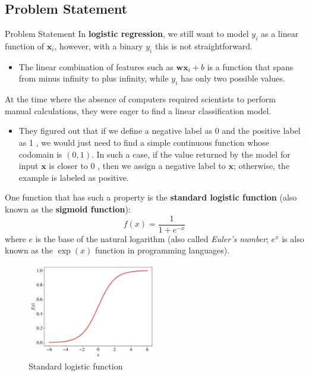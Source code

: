 \documentclass[9pt,dvipsnames]{beamer}
\begin{document}
\subsection{Problem Statement}
\begin{frame}{Problem Statement}
	In \textbf{logistic regression}, we still want to model $y_{i}$ as a linear function of $\mathbf{x}_{i}$, however, with a binary $y_{i}$ this is not straightforward. 
	\begin{itemize}
		\item The linear combination of features such as $\mathbf{w} \mathbf{x}_{i}+b$ is a function that spans from minus infinity to plus infinity, while $y_{i}$ has only two possible values.
	\end{itemize}
	
	At the time where the absence of computers required scientists to perform manual calculations, they were eager to find a linear classification model. 
	\begin{itemize}
		\item They figured out that if we define a negative label as 0 and the positive label as 1 , we would just need to find a simple continuous function whose codomain is $(0,1)$. In such a case, if the value returned by the model for input $\mathbf{x}$ is closer to 0 , then we assign a negative label to $\mathbf{x}$; otherwise, the example is labeled as positive.
	\end{itemize}
\end{frame}

\begin{frame}
One function that has such a property is the \textbf{standard logistic function} (also  known as the \textbf{sigmoid function}):
$$
f(x)=\frac{1}{1+e^{-x}}
$$
where $e$ is the base of the natural logarithm (also called \textit{Euler's number}; $e^{x}$ is also known as the $\exp (x)$ function in programming languages).
\begin{figure}
	\centering
	\includegraphics[width=0.5\textwidth]{imgs/algorithm_3.jpg}
	\caption{Standard logistic function}
\end{figure}
\end{frame}
\end{document}
